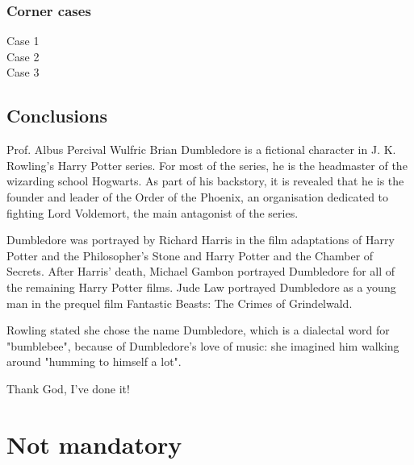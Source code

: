 \documentclass{swfuthesise}
\begin{document}
\subsection{Corner cases}

\begin{description}
\item[Case 1] \lipsum[40]
\item[Case 2] \lipsum[41]
\item[Case 3] \lipsum[42]
\end{description}

\section{Conclusions}

\lipsum[43-44]

\appendix %

\makebib %

\begin{advisorInfo} %
  
  Prof. Albus Percival Wulfric Brian Dumbledore is a fictional character in
  J. K. Rowling's Harry Potter series. For most of the series, he is the headmaster of the
  wizarding school Hogwarts. As part of his backstory, it is revealed that he is the
  founder and leader of the Order of the Phoenix, an organisation dedicated to fighting
  Lord Voldemort, the main antagonist of the series.

  Dumbledore was portrayed by Richard Harris in the film adaptations of Harry Potter and
  the Philosopher's Stone and Harry Potter and the Chamber of Secrets. After Harris'
  death, Michael Gambon portrayed Dumbledore for all of the remaining Harry Potter
  films. Jude Law portrayed Dumbledore as a young man in the prequel film Fantastic
  Beasts: The Crimes of Grindelwald.

  Rowling stated she chose the name Dumbledore, which is a dialectal word for "bumblebee",
  because of Dumbledore's love of music: she imagined him walking around "humming to
  himself a lot".

\end{advisorInfo}

\begin{acknowledgment} %
  Thank God, I've done it!
\end{acknowledgment}

\singlespacing

\chapter{Not mandatory}
\end{document}
